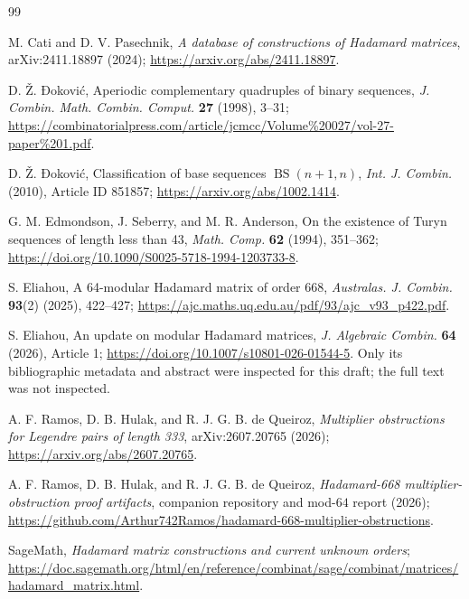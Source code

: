 \documentclass[11pt]{article}
\theoremstyle{remark}
\newcommand{\BS}{\operatorname{BS}}
\begin{document}
\begin{thebibliography}{99}
\small
\setlength{\itemsep}{0.35em}

M. Cati and D. V. Pasechnik,
\emph{A database of constructions of Hadamard matrices},
arXiv:2411.18897 (2024);
\url{https://arxiv.org/abs/2411.18897}.

D. Ž. Đoković,
Aperiodic complementary quadruples of binary sequences,
\emph{J. Combin. Math. Combin. Comput.} \textbf{27} (1998), 3--31;
\url{https://combinatorialpress.com/article/jcmcc/Volume%20027/vol-27-paper%201.pdf}.

D. Ž. Đoković,
Classification of base sequences $\BS(n+1,n)$,
\emph{Int. J. Combin.} (2010), Article ID 851857;
\url{https://arxiv.org/abs/1002.1414}.

G. M. Edmondson, J. Seberry, and M. R. Anderson,
On the existence of Turyn sequences of length less than 43,
\emph{Math. Comp.} \textbf{62} (1994), 351--362;
\url{https://doi.org/10.1090/S0025-5718-1994-1203733-8}.

S. Eliahou,
A 64-modular Hadamard matrix of order 668,
\emph{Australas. J. Combin.} \textbf{93}(2) (2025), 422--427;
\url{https://ajc.maths.uq.edu.au/pdf/93/ajc_v93_p422.pdf}.

S. Eliahou,
An update on modular Hadamard matrices,
\emph{J. Algebraic Combin.} \textbf{64} (2026), Article 1;
\url{https://doi.org/10.1007/s10801-026-01544-5}.
Only its bibliographic metadata and abstract were inspected for this draft;
the full text was not inspected.

A. F. Ramos, D. B. Hulak, and R. J. G. B. de Queiroz,
\emph{Multiplier obstructions for Legendre pairs of length 333},
arXiv:2607.20765 (2026);
\url{https://arxiv.org/abs/2607.20765}.

A. F. Ramos, D. B. Hulak, and R. J. G. B. de Queiroz,
\emph{Hadamard-668 multiplier-obstruction proof artifacts},
companion repository and mod-$64$ report (2026);
\url{https://github.com/Arthur742Ramos/hadamard-668-multiplier-obstructions}.

SageMath,
\emph{Hadamard matrix constructions and current unknown orders};
\url{https://doc.sagemath.org/html/en/reference/combinat/sage/combinat/matrices/hadamard_matrix.html}.

\end{thebibliography}
\end{document}
